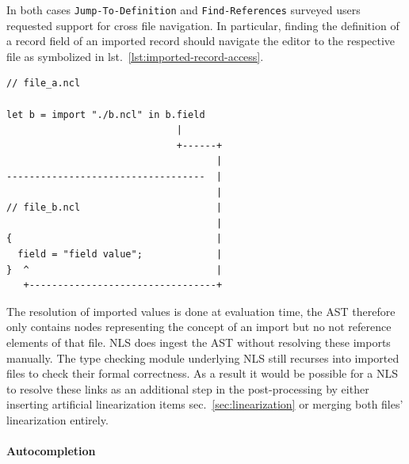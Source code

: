 \documentclass[
  a4paper,
  bibtex,
  english,
  nomenclature]{kthlatex/kththesis/kththesis}
\begin{document}
In both cases \texttt{Jump-To-Definition} and \texttt{Find-References}
surveyed users requested support for cross file navigation. In
particular, finding the definition of a record field of an imported
record should navigate the editor to the respective file as symbolized
in lst.~\ref{lst:imported-record-access}.

\begin{codelisting}

\caption{Minimal example of cross file referencing}

\hypertarget{lst:imported-record-access}{%
\label{lst:imported-record-access}}%
\begin{verbatim}
// file_a.ncl

let b = import "./b.ncl" in b.field
                              |
                              +------+
                                     |
-----------------------------------  |
                                     |
// file_b.ncl                        |
                                     |
{                                    |
  field = "field value";             |
}  ^                                 |
   +---------------------------------+
\end{verbatim}

\end{codelisting}

The resolution of imported values is done at evaluation time, the AST
therefore only contains nodes representing the concept of an import but
no not reference elements of that file. NLS does ingest the AST without
resolving these imports manually. The type checking module underlying
NLS still recurses into imported files to check their formal
correctness. As a result it would be possible for a NLS to resolve these
links as an additional step in the post-processing by either inserting
artificial linearization items sec.~\ref{sec:linearization} or merging
both files' linearization entirely.

\hypertarget{sec:autocompletion}{%
\paragraph{Autocompletion}\label{sec:autocompletion}}
\end{document}
